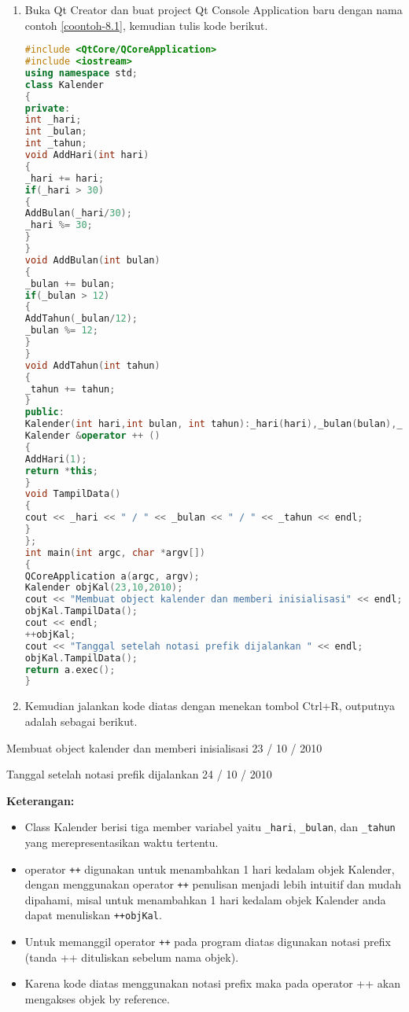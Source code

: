 \begin{enumerate}
\def\labelenumi{\arabic{enumi}.}
\item
  Buka Qt Creator dan buat project Qt Console Application baru dengan
  nama contoh \ref{coontoh-8.1}, kemudian tulis kode berikut.

\begin{lstlisting}[language=c++, caption=Menggunakan Increment Operator (Notasi prefix), label=coontoh-8.1]
#include <QtCore/QCoreApplication>
#include <iostream>
using namespace std;
class Kalender
{
private:
int _hari;
int _bulan;
int _tahun;
void AddHari(int hari)
{
_hari += hari;
if(_hari > 30)
{
AddBulan(_hari/30);
_hari %= 30;
}
}
void AddBulan(int bulan)
{
_bulan += bulan;
if(_bulan > 12)
{
AddTahun(_bulan/12);
_bulan %= 12;
}
}
void AddTahun(int tahun)
{
_tahun += tahun;
}
public:
Kalender(int hari,int bulan, int tahun):_hari(hari),_bulan(bulan),_tahun(tahun){ }
Kalender &operator ++ ()
{
AddHari(1);
return *this;
}
void TampilData()
{
cout << _hari << " / " << _bulan << " / " << _tahun << endl;
}
};
int main(int argc, char *argv[])
{
QCoreApplication a(argc, argv);
Kalender objKal(23,10,2010);
cout << "Membuat object kalender dan memberi inisialisasi" << endl;
objKal.TampilData();
cout << endl;
++objKal;
cout << "Tanggal setelah notasi prefik dijalankan " << endl;
objKal.TampilData();
return a.exec();
}
\end{lstlisting}
\item
  Kemudian jalankan kode diatas dengan menekan tombol Ctrl+R, outputnya
  adalah sebagai berikut.
\end{enumerate}

\begin{lcverbatim}
Membuat object kalender dan memberi inisialisasi
23 / 10 / 2010

Tanggal setelah notasi prefik dijalankan
24 / 10 / 2010
\end{lcverbatim}

\textbf{Keterangan:}

\begin{itemize}
\tightlist
\item
  Class Kalender berisi tiga member variabel yaitu \texttt{\_hari},
  \texttt{\_bulan}, dan \texttt{\_tahun} yang merepresentasikan waktu
  tertentu.
\item
  operator \texttt{++} digunakan untuk menambahkan 1 hari kedalam objek
  Kalender, dengan menggunakan operator \texttt{++} penulisan menjadi
  lebih intuitif dan mudah dipahami, misal untuk menambahkan 1 hari
  kedalam objek Kalender anda dapat menuliskan \texttt{++objKal}.
\item
  Untuk memanggil operator \texttt{++} pada program diatas digunakan
  notasi prefix (tanda ++ dituliskan sebelum nama objek).
\item
  Karena kode diatas menggunakan notasi prefix maka pada operator ++
  akan mengakses objek by reference.
\end{itemize}

